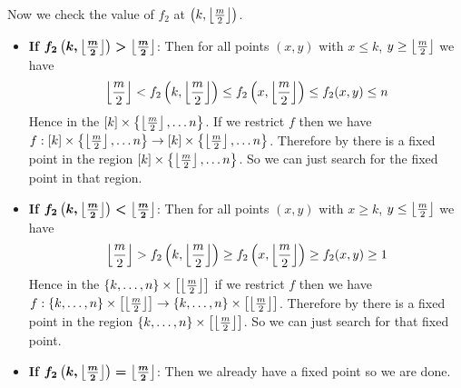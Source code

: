 \documentclass[a4paper, 11pt]{article}
\begin{document}
{Now we check the value of $f_2$ at $\left(k,\left\lfloor \frac{m}{2}\right\rfloor\right)$. \begin{itemize}
	\item \textbf{If }$\boldsymbol{f_2\left(k,\left\lfloor \frac{m}{2}\right\rfloor\right)>\left\lfloor \frac{m}{2}\right\rfloor}$: Then for all points $(x,y)$ with $x\leq k$, $y\geq \left\lfloor \frac{m}{2}\right\rfloor$ we have $$\left\lfloor \frac{m}{2}\right\rfloor<f_2\left(k,\left\lfloor \frac{m}{2}\right\rfloor\right)\leq f_2\left(x,\left\lfloor \frac{m}{2}\right\rfloor\right)\leq f_2(x,y)\leq n$$ Hence in the $[k]\times  \left\{\left\lfloor\frac{m}{2} \right\rfloor,\dots n\right\}$. If we restrict $f$ then we have $f:[k]\times \left\{\left\lfloor\frac{m}{2} \right\rfloor,\dots n\right\}\to [k]\times  \left\{\left\lfloor\frac{m}{2} \right\rfloor,\dots n\right\}$. Therefore by  there is a fixed point in the region $[k]\times\left\{\left\lfloor\frac{m}{2} \right\rfloor,\dots n\right\}$. So we can just search for the fixed point in that region. 
	\item  \textbf{If }$\boldsymbol{f_2\left(k,\left\lfloor \frac{m}{2}\right\rfloor\right)<\left\lfloor \frac{m}{2}\right\rfloor}$: Then for all points $(x,y)$ with $x\geq k$, $y\leq \left\lfloor \frac{m}{2}\right\rfloor$ we have 
	$$\left\lfloor \frac{m}{2}\right\rfloor>f_2\left(k,\left\lfloor \frac{m}{2}\right\rfloor\right)\geq f_2\left(x,\left\lfloor \frac{m}{2}\right\rfloor\right)\geq f_2(x,y)\geq 1$$
	Hence in the $\{k,\dots, n\}\times\left[\left\lfloor\frac{m}{2} \right\rfloor\right] $ if we restrict $f$ then we have $f:\{k,\dots, n\}\times\left[\left\lfloor\frac{m}{2} \right\rfloor\right]\to  \{k,\dots, n\}\times\left[\left\lfloor\frac{m}{2} \right\rfloor\right]$. Therefore by  there is a fixed point in the region $\{k,\dots, n\}\times\left[\left\lfloor\frac{m}{2} \right\rfloor\right]$. So we can just search for that fixed point.
	 \item \textbf{If }$\boldsymbol{f_2\left(k,\left\lfloor \frac{m}{2}\right\rfloor\right)=\left\lfloor \frac{m}{2}\right\rfloor}$: Then we already have a fixed point so we are done.
\end{itemize}\parinf

}
\end{document}
